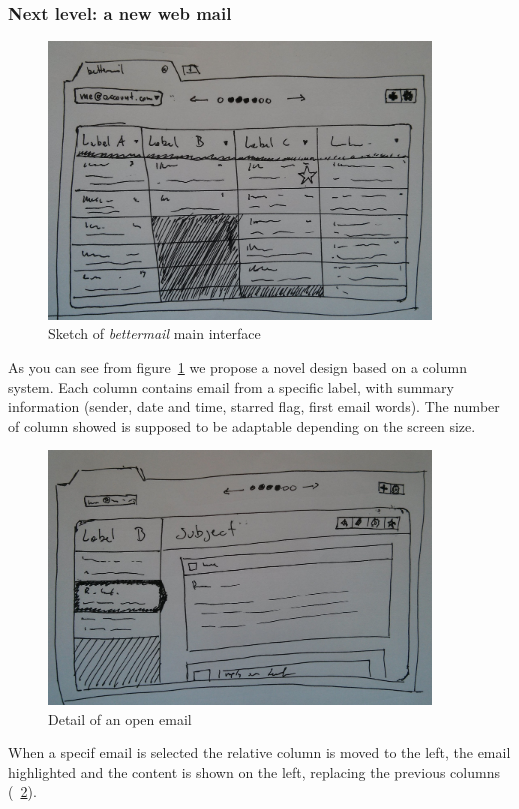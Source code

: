 \documentclass[a4paper,12pt]{report}
\begin{document}
\subsubsection{Next level: a new web mail}

\begin{figure}[H]
  \centering
  \includegraphics[width=4in]{new}
  \caption{Sketch of \emph{bettermail} main interface}
  \label{fig:new1}
\end{figure}
As you can see from figure~\ref{fig:new1} we propose a novel design based on a column system. 
Each column contains email from a specific label, with summary information (sender, date and time, starred flag, first email words). The number of column showed is supposed to be adaptable depending on the screen size. 


\begin{figure}[H]
  \centering
  \includegraphics[width=4in]{new_2_cols}
  \caption{Detail of an open email}
  \label{fig:new2}
\end{figure}

When a specif email is selected the relative column is moved to the left, the email highlighted and the content is shown on the left, replacing the previous columns (~\ref{fig:new2}).
\end{document}
